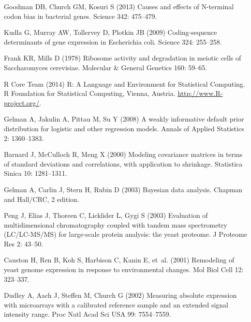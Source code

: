 \documentclass[10pt]{article}
\begin{document}
\begin{thebibliography}{10}
Goodman DB, Church GM, Kosuri S (2013) {Causes and effects of N-terminal codon
  bias in bacterial genes}.
\newblock Science 342: 475--479.

Kudla G, Murray AW, Tollervey D, Plotkin JB (2009) {Coding-sequence
  determinants of gene expression in Escherichia coli}.
\newblock Science 324: 255--258.

Frank KR, Mills D (1978) {Ribosome activity and degradation in meiotic cells of
  Saccharomyces cerevisiae.}
\newblock Molecular \& General Genetics 160: 59--65.

{R Core Team} (2014) R: A Language and Environment for Statistical Computing.
\newblock R Foundation for Statistical Computing, Vienna, Austria.
\newblock \urlprefix\url{http://www.R-project.org/}.

Gelman A, Jakulin A, Pittau M, Su Y (2008) A weakly informative default prior
  distribution for logistic and other regression models.
\newblock Annals of Applied Statistics 2: 1360--1383.

Barnard J, McCulloch R, Meng X (2000) Modeling covariance matrices in terms of
  standard deviations and correlations, with application to shrinkage.
\newblock Statistica Sinica 10: 1281--1311.

Gelman A, Carlin J, Stern H, Rubin D (2003) Bayesian data analysis.
\newblock Chapman and Hall/CRC, 2 edition.

Peng J, Elias J, Thoreen C, Licklider L, Gygi S (2003) Evaluation of
  multidimensional chromatography coupled with tandem mass spectrometry
  {(LC/LC-MS/MS)} for large-scale protein analysis: the yeast proteome.
\newblock J Proteome Res 2: 43--50.

Causton H, Ren B, Koh S, Harbison C, Kanin E, et~al. (2001) Remodeling of yeast
  genome expression in response to environmental changes.
\newblock Mol Biol Cell 12: 323--337.

Dudley A, Aach J, Steffen M, Church G (2002) Measuring absolute expression with
  microarrays with a calibrated reference sample and an extended signal
  intensity range.
\newblock Proc Natl Acad Sci USA 99: 7554--7559.


\end{thebibliography}
\end{document}
